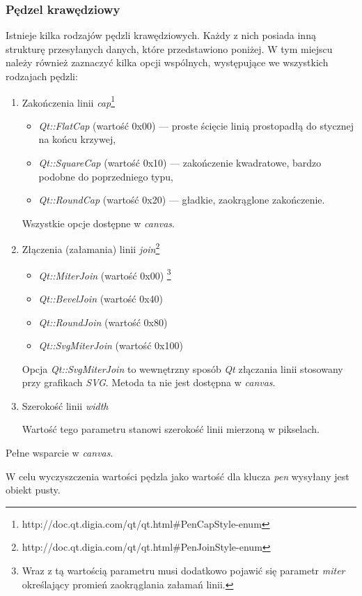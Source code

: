\subsubsection{Pędzel krawędziowy}
Istnieje kilka rodzajów pędzli krawędziowych. Każdy z nich posiada inną strukturę przesyłanych danych, które przedstawiono poniżej. W tym miejscu należy również zaznaczyć kilka opcji wspólnych, występujące we wszystkich rodzajach pędzli:
\begin{enumerate}
\item Zakończenia linii \emph{cap}\footnote{http://doc.qt.digia.com/qt/qt.html\#PenCapStyle-enum}
\begin{itemize}
\item \emph{Qt::FlatCap} (wartość 0x00) --- proste ścięcie linią prostopadłą do stycznej na końcu krzywej,
\item \emph{Qt::SquareCap} (wartość 0x10) --- zakończenie kwadratowe, bardzo podobne do poprzedniego typu,
\item \emph{Qt::RoundCap} (wartość 0x20) --- gładkie, zaokrąglone zakończenie.
\end{itemize}
Wszystkie opcje dostępne w \emph{canvas}.

\item Złączenia (załamania) linii \emph{join}\footnote{http://doc.qt.digia.com/qt/qt.html\#PenJoinStyle-enum}
\begin{itemize}
\item \emph{Qt::MiterJoin} (wartość 0x00) \footnote{Wraz z tą wartością parametru musi dodatkowo pojawić się parametr \emph{miter} określający promień zaokrąglania załamań linii.}
\item \emph{Qt::BevelJoin} (wartość 0x40)
\item \emph{Qt::RoundJoin} (wartość 0x80)
\item \emph{Qt::SvgMiterJoin} (wartość 0x100)
\end{itemize}
Opcja \emph{Qt::SvgMiterJoin} to wewnętrzny sposób \emph{Qt} złączania linii stosowany przy grafikach \emph{SVG}. Metoda ta nie jest dostępna w \emph{canvas}.

\item Szerokość linii \emph{width}

Wartość tego parametru stanowi szerokość linii mierzoną w pikselach.
\end{enumerate}
Pełne wsparcie w \emph{canvas}.

W celu wyczyszczenia wartości pędzla jako wartość dla klucza \emph{pen} wysyłany jest obiekt pusty.


